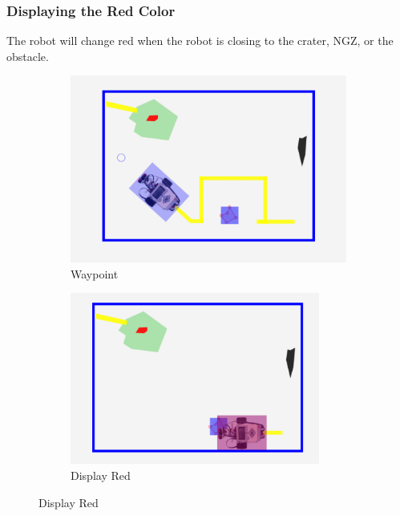 \documentclass[10pt,a4paper,titlepage]{article}
\begin{document}
	\subsubsection{  Displaying the Red Color} 
The robot will change red when the robot is closing to the crater, NGZ, or the obstacle.  

\begin{figure}[H]
	\centering
	\begin{subfigure}[t]{0.45\textwidth}
  \includegraphics[width=\linewidth]{waypoint.png}  %
\caption{Waypoint} 
\label{fig:Waypoint}                 
	\end{subfigure}
	\begin{subfigure}[t]{0.45\textwidth}
  \includegraphics[width=0.9\textwidth]{red.png}  %
\caption{Display Red} 
\label{fig:Display Red}              
	\end{subfigure}
\end{figure}
\end{document}
